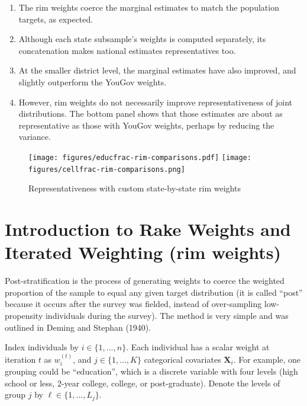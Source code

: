 \documentclass[11pt]{article}
\begin{document}
\medskip
\begin{enumerate}
\item The rim weights coerce the marginal estimates to match the population targets, as expected.
\item Although each state subsample's weights is computed separately, its concatenation makes national estimates representatives too. 
\item At the smaller district level, the marginal estimates have also improved, and slightly outperform the YouGov weights.
\item However, rim weights do not necessarily improve representativeness of joint distributions. The bottom panel shows that those estimates are about as representative as those with YouGov weights, perhaps by reducing the variance.
\end{enumerate}

\FloatBarrier

\begin{figure}[!htbp]
\centering
\caption{Representativeness with custom state-by-state rim weights \label{fig:rim-comparisons}}
\texttt{[image: figures/educfrac-rim-comparisons.pdf]}
\texttt{[image: figures/cellfrac-rim-comparisons.png]}
\end{figure}

\FloatBarrier

\pagebreak


\appendix

\section{Introduction to Rake Weights and Iterated Weighting (rim weights)}

Post-stratification is the process of generating weights to coerce the weighted proportion of the sample to equal any given target distribution (it is called ``post'' because it occurs after the survey was fielded, instead of over-sampling low-propensity individuals during the survey). The method is very simple and was outlined in Deming and Stephan (1940). 

Index individuals by \(i \in \{1, ..., n\}\). Each individual has a scalar weight at iteration \(t\) as \(w^{(t)}_i\), and \(j \in \{1, ..., K\}\) categorical covariates \(\bm{X}_i\). For example, one grouping could be ``education'', which is a discrete variable with four levels (high school or less, 2-year college, college, or post-graduate). Denote the levels of group \(j\) by \(\ell \in \{1, ..., L_j\}\). 
\end{document}
